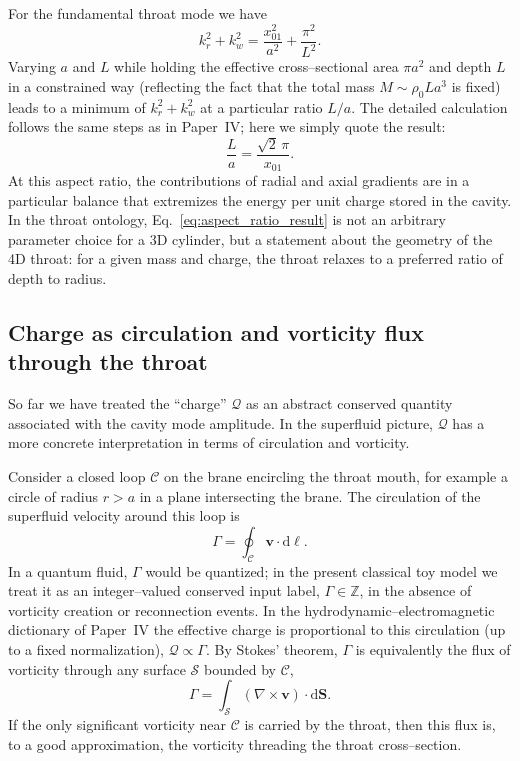 \documentclass[12pt]{article}
\begin{document}
For the fundamental throat mode we have
\begin{equation}
  k_r^2 + k_w^2
  = \frac{x_{01}^2}{a^2}
    + \frac{\pi^2}{L^2}.
\end{equation}
Varying $a$ and $L$ while holding the effective cross--sectional area
$\pi a^2$ and depth $L$ in a constrained way (reflecting the fact that the
total mass $M\sim \rho_0 L a^3$ is fixed) leads to a minimum of
$k_r^2 + k_w^2$ at a particular ratio $L/a$.  The detailed calculation
follows the same steps as in Paper~IV; here we simply quote the result:
\begin{equation}
  \frac{L}{a}
  = \frac{\sqrt{2}\,\pi}{x_{01}}.
\end{equation}
At this aspect ratio, the contributions of radial and axial gradients are in
a particular balance that extremizes the energy per unit charge stored in
the cavity.  In the throat ontology, Eq.~\eqref{eq:aspect_ratio_result} is
not an arbitrary parameter choice for a 3D cylinder, but a statement about
the geometry of the 4D throat: for a given mass and charge, the throat
relaxes to a preferred ratio of depth to radius.

\subsection{Charge as circulation and vorticity flux through the throat}
\label{subsec:charge_flux}

So far we have treated the ``charge'' $\mathcal{Q}$ as an abstract conserved
quantity associated with the cavity mode amplitude.  In the superfluid
picture, $\mathcal{Q}$ has a more concrete interpretation in terms of
circulation and vorticity.

Consider a closed loop $\mathcal{C}$ on the brane encircling the throat
mouth, for example a circle of radius $r>a$ in a plane intersecting the
brane.  The circulation of the superfluid velocity around this loop is
\begin{equation}
  \Gamma
  = \oint_{\mathcal{C}} \mathbf{v}\cdot\mathrm{d}\boldsymbol{\ell}.
\end{equation}
In a quantum fluid, $\Gamma$ would be quantized; in the present classical
toy model we treat it as an integer--valued conserved input label,
$\Gamma\in\mathbb{Z}$, in the absence of vorticity creation or reconnection
events.  In the hydrodynamic--electromagnetic dictionary of Paper~IV the
effective charge is proportional to this circulation (up to a fixed
normalization), $\mathcal{Q}\propto\Gamma$.  By Stokes' theorem, $\Gamma$ is
equivalently the flux of vorticity through any surface $\mathcal{S}$
bounded by $\mathcal{C}$,
\begin{equation}
  \Gamma
  = \int_{\mathcal{S}}
      (\nabla\times\mathbf{v})\cdot\mathrm{d}\mathbf{S}.
\end{equation}
If the only significant vorticity near $\mathcal{C}$ is carried by the
throat, then this flux is, to a good approximation, the vorticity threading
the throat cross--section.
\end{document}
